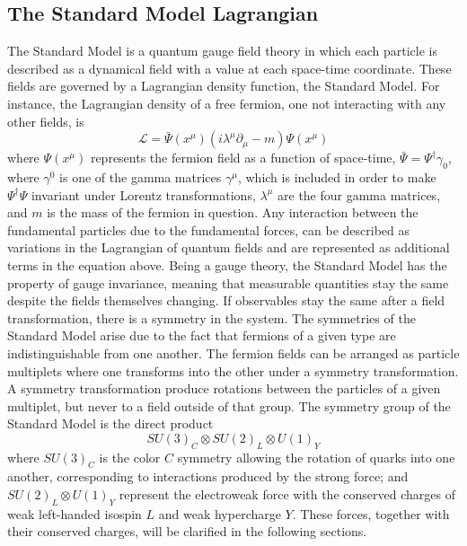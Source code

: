 \subsection{The Standard Model Lagrangian}
\label{sec:theory:gauge}
The Standard Model is a quantum gauge field theory in which each particle is described as a dynamical field with a value at each space-time coordinate. These fields are governed by a Lagrangian density function, the Standard Model. For instance, the Lagrangian density of a free fermion, one not interacting with any other fields, is
\begin{equation}
  \mathcal{L} = \bar{\Psi}(x^{\mu})(i\lambda^{\mu}\partial_{\mu}-m)\Psi(x^{\mu})
\end{equation}
where $\Psi(x^{\mu})$ represents the fermion field as a function of space-time, $\bar{\Psi}=\Psi^{\dagger}\gamma_0$, where $\gamma^0$ is one of the gamma matrices $\gamma^{\mu}$, which is included in order to make $\Psi^{\dagger}\Psi$ invariant under Lorentz transformations, $\lambda^{\mu}$ are the four gamma matrices, and $m$ is the mass of the fermion in question. Any interaction between the fundamental particles due to the fundamental forces, can be described as variations in the Lagrangian of quantum fields and are represented as additional terms in the equation above.\newline
Being a gauge theory, the Standard Model has the property of gauge invariance, meaning that measurable quantities stay the same despite the fields themselves changing. If observables stay the same after a field transformation, there is a symmetry in the system. The symmetries of the Standard Model arise due to the fact that fermions of a given type are indistinguishable from one another.
The fermion fields can be arranged as particle multiplets where one transforms into the other under a symmetry transformation. A symmetry transformation produce rotations between the particles of a given multiplet, but never to a field outside of that group. The symmetry group of the Standard Model is the direct product
\begin{equation}
  SU(3)_C \otimes SU (2)_L \otimes U(1)_Y
\end{equation}
where $SU(3)_C$ is the color $C$ symmetry allowing the rotation of quarks into one another, corresponding to interactions produced by the strong force; and $SU (2)_L \otimes U(1)_Y$ represent the electroweak force with the conserved charges of weak left-handed isospin $L$ and weak hypercharge $Y$. These forces, together with their conserved charges, will be clarified in the following sections.

